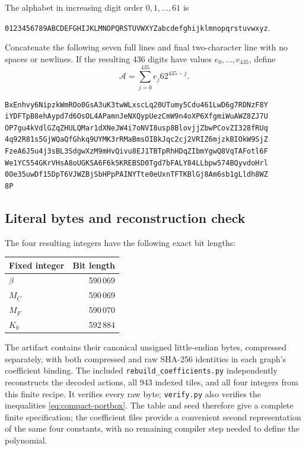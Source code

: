 The alphabet in increasing digit order \(0,1,\ldots,61\) is
\begin{center}
\texttt{0123456789ABCDEFGHIJKLMNOPQRSTUVWXYZabcdefghijklmnopqrstuvwxyz}.
\end{center}
Concatenate the following seven full lines and final two-character line
with no spaces or newlines.  If the resulting 436 digits have values
\(e_0,\ldots,e_{435}\), define
\[
 \mathcal A=\sum_{j=0}^{435}e_j62^{435-j}.
\]
\begin{lstlisting}[language={},basicstyle=\ttfamily\footnotesize,
  columns=fixed,keepspaces=true,breaklines=false]
BxEnhvy6NipzkWmROo0GsA3uK3twWLxscLq20UTumy5Cdu461LwD6g7RDNzF8Y
iYDFTpB8ehAypd7d6OsOL4APamnJeNXQypUezCmW9n4oXP6XfgmiWuAWZ8ZJ7U
OP7gu4kVdlGZqZHULQMar1dXNeJW4i7oNVI8usp8BlovjjZbwPCovZI328fRUq
4q92R81s5GjWQaQfGhkq9UYMK3rRMaBmsOIBkJqc2cj2VRIZ6mjzkBIOkW9SjZ
FzeA6J5u4j3sBL3SdgwXzM9mHvQivu8EJ1TBTpRhHDqZIbmYgwQ8VqTAFotl6F
We1YC554GKrVHsA8oUGKSA6F6k5KREBSD0Tgd7bFALY84LLbpw574BQyvdoHrl
0Oe35uwDf15DpT6VJWZBjSbHPpPAINYTte0eUxnTFTKBlGj8Am6sb1gLldh8WZ
8P
\end{lstlisting}

\subsection{Literal bytes and reconstruction check}

The four resulting integers have the following exact bit lengths:
\begin{center}
\begin{tabular}{@{}lr@{}}
\toprule
Fixed integer & Bit length\\
\midrule
\(\beta\) & 590\,069\\
\(M_C\) & 590\,069\\
\(M_F\) & 590\,070\\
\(K_0\) & 592\,884\\
\bottomrule
\end{tabular}
\end{center}
The artifact contains their canonical unsigned little-endian bytes,
compressed separately, with both compressed and raw SHA-256 identities
in each graph's coefficient binding.  The included
\texttt{rebuild\_coefficients.py} independently reconstructs the decoded
actions, all 943 indexed tiles, and all four integers from this finite
recipe.  It verifies every raw byte; \texttt{verify.py} also verifies
the inequalities \eqref{eq:compact-portbox}.  The table and seed therefore give a complete
finite specification; the coefficient files provide a convenient second
representation of the same four constants, with no remaining compiler
step needed to define the polynomial.
